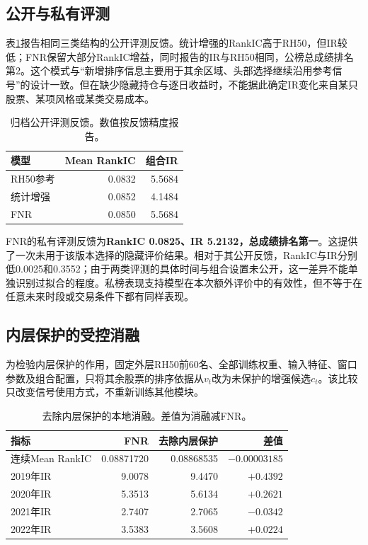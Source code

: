 \documentclass[UTF8,11pt,a4paper,fontset=fandol]{ctexart}
\begin{document}
\subsection{公开与私有评测}
表\ref{tab:public}报告相同三类结构的公开评测反馈。统计增强的RankIC高于RH50，但IR较低；FNR保留大部分RankIC增益，同时报告的IR与RH50相同，公榜总成绩排名第2。这个模式与“新增排序信息主要用于其余区域、头部选择继续沿用参考信号”的设计一致。但在缺少隐藏持仓与逐日收益时，不能据此确定IR变化来自某只股票、某项风格或某类交易成本。

\begin{table}[htbp]\centering\small
\caption{归档公开评测反馈。数值按反馈精度报告。}\label{tab:public}
\begin{tabular}{lrr}\toprule
模型 & Mean RankIC & 组合IR\\\midrule
RH50参考 & 0.0832 & 5.5684\\
统计增强 & 0.0852 & 4.1484\\
FNR & 0.0850 & 5.5684\\\bottomrule
\end{tabular}
\end{table}

FNR的私有评测反馈为\textbf{RankIC 0.0825、IR 5.2132，总成绩排名第一}。这提供了一次未用于该版本选择的隐藏评价结果。相对于其公开反馈，RankIC与IR分别低0.0025和0.3552；由于两类评测的具体时间与组合设置未公开，这一差异不能单独识别过拟合的程度。私榜表现支持模型在本次额外评价中的有效性，但不等于在任意未来时段或交易条件下都有同样表现。

\subsection{内层保护的受控消融}
为检验内层保护的作用，固定外层RH50前60名、全部训练权重、输入特征、窗口参数及组合配置，只将其余股票的排序依据从$v_t$改为未保护的增强候选$c_t$。该比较只改变信号使用方式，不重新训练其他模块。

\begin{table}[htbp]\centering\small
\caption{去除内层保护的本地消融。差值为消融减FNR。}\label{tab:ablation}
\begin{tabular}{lrrr}\toprule
指标 & FNR & 去除内层保护 & 差值\\\midrule
连续Mean RankIC & 0.08871720 & 0.08868535 & $-0.00003185$\\
2019年IR & 9.0078 & 9.4470 & $+0.4392$\\
2020年IR & 5.3513 & 5.6134 & $+0.2621$\\
2021年IR & 2.7407 & 2.7065 & $-0.0342$\\
2022年IR & 3.5383 & 3.5608 & $+0.0224$\\\bottomrule
\end{tabular}
\end{table}
\end{document}
